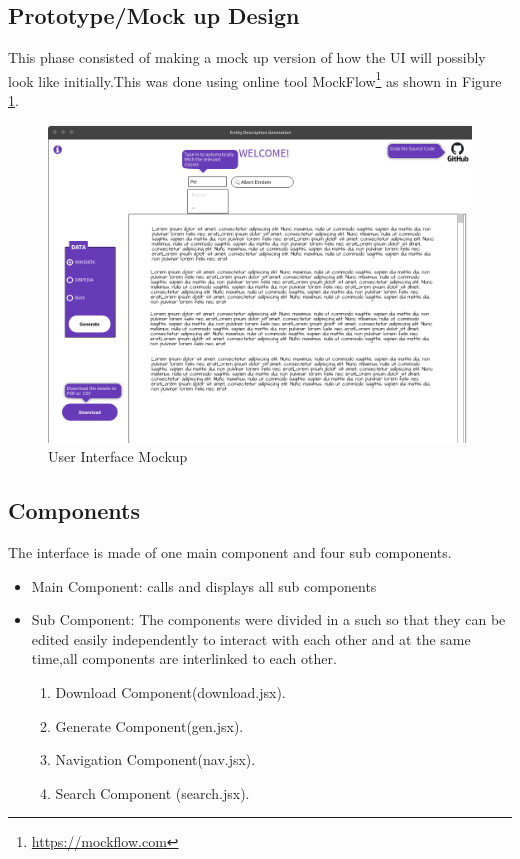 \documentclass[head,11pt]{llncs}
\begin{document}
\subsection{Prototype/Mock up Design}
This phase consisted of making a mock up version of how the UI will possibly look like initially.This was done using online tool MockFlow\footnote{\url{https://mockflow.com}} as shown in Figure \ref{ui mockup}.


\begin{figure}
\includegraphics[width=120mm]{figures/mockup.png}
\caption{User Interface Mockup}
\label{ui mockup}
\end{figure}


\subsection{Components}
The interface is made of one main component and four sub components.
\begin{itemize}
\item Main Component: calls and displays all sub components
\item Sub Component: The components were divided in a such so that they can be edited easily independently to interact with each other and at the same time,all components are interlinked to each other.
\begin{enumerate}
\item Download Component(download.jsx).
\item Generate Component(gen.jsx).
\item Navigation Component(nav.jsx).
\item Search Component (search.jsx).
\end{enumerate}

\end{itemize}
\end{document}
